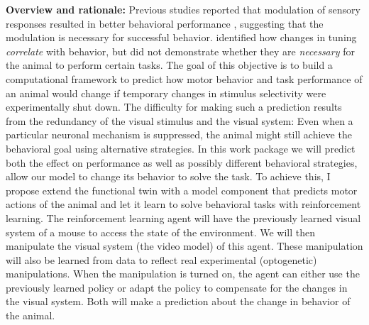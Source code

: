 \documentclass[B2,COG]{ercgrant}
\begin{document}
\textbf{Overview and rationale:} 
Previous studies reported that modulation of sensory responses resulted in better behavioral performance \parencite{Spitzer1988-kq, Bennett2013-rk, Dadarlat2017-jw, De_Gee2022-ir}, suggesting that the modulation is necessary for successful behavior. 
 identified how changes in tuning \textit{correlate} with behavior, but did not demonstrate whether they are \textit{necessary} for the animal to perform certain tasks.
The goal of this objective is to build a computational framework to predict how motor behavior and task performance of an animal would change if temporary changes in stimulus selectivity were experimentally shut down.  
The difficulty for making such a prediction results from the redundancy of the visual stimulus and the visual system: 
Even when a particular neuronal mechanism is suppressed, the animal might still achieve the behavioral goal using alternative strategies.
In this work package we will predict both the effect on performance as well as possibly different behavioral strategies, allow our model to change its behavior to solve the task. 
To achieve this, I propose extend the functional twin with a model component that predicts motor actions of the animal and let it learn to solve behavioral tasks with reinforcement learning.
The reinforcement learning agent will have the previously learned visual system of a mouse to access the state of the environment.
We will then manipulate the visual system (the video model) of this agent. 
These manipulation will also be learned from data to reflect real experimental (optogenetic) manipulations.
When the manipulation is turned on, the agent can either use the previously learned policy or adapt the policy to compensate for the changes in the visual system.
Both will make a prediction about the change in behavior of the animal. 
\end{document}
